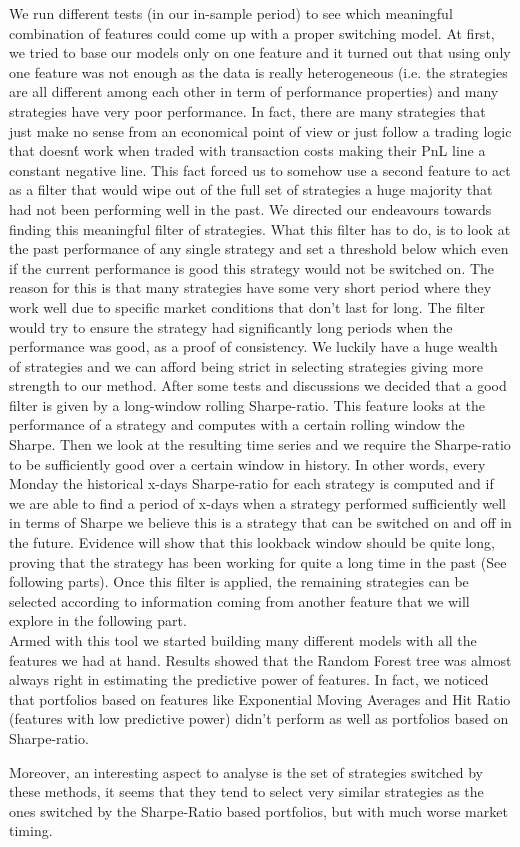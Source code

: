 We run different tests (in our in-sample period) to see which meaningful combination of features could come up with a proper switching model. At first, we tried to base our models only on one feature and it turned out that using only one feature was not enough as the data is really heterogeneous (i.e. the strategies are all different among each other in term of performance properties) and many strategies have very poor performance. In fact, there are many strategies that just make no sense from an economical point of view or just follow a trading logic that doesn\'t work when traded with transaction costs making their PnL line a constant negative line.
This fact forced us to somehow use a second feature to act as a filter that would wipe out of the full set of strategies a huge majority that had not been performing well in the past. We directed our endeavours towards finding this meaningful filter of strategies. What this filter has to do, is to look at the past performance of any single strategy and set a threshold below which even if the current performance is good this strategy would not be switched on. The reason for this is that many strategies have some very short period where they work well due to specific market conditions that don't last for long. The filter would try to ensure the strategy had significantly long periods when the performance was good, as a proof of consistency. We luckily have a huge wealth of strategies and we can afford being strict in selecting strategies giving more strength to our method. After some tests and discussions we decided that a good filter is given by a long-window rolling Sharpe-ratio. This feature looks at the performance of a strategy and computes with a certain rolling window the Sharpe. Then we look at the resulting time series and we require the Sharpe-ratio to be sufficiently good over a certain window in history. In other words, every Monday the historical x-days Sharpe-ratio for each strategy is computed and if we are able to find  a period of x-days when a strategy performed sufficiently well in terms of Sharpe we believe this is a strategy that can be switched on and off in the future. Evidence will show that this lookback window should be quite long, proving that the strategy has been working for quite a long time in the past (See following parts). Once this filter is applied, the remaining strategies can be selected according to information coming from another feature that we will explore in the following part.\\
Armed with this tool we started building many different models with all the features we had at hand. Results showed that the Random Forest tree was almost always right in estimating the predictive power of features. In fact, we noticed that portfolios based on features like Exponential Moving Averages and Hit Ratio (features with low predictive power) didn't perform as well as portfolios based on Sharpe-ratio.

Moreover, an interesting aspect to analyse is the set of strategies switched by these methods, it seems that they tend to select very similar strategies as the ones switched by the Sharpe-Ratio based portfolios, but with much worse market timing.\\
